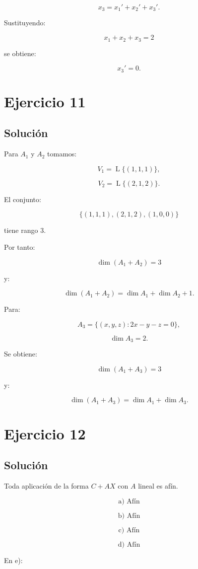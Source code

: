 \documentclass[11pt,a4paper]{article}
\newcommand{\Span}{\operatorname{L}}
\begin{document}
\[
x_3=x_1'+x_2'+x_3'.
\]

Sustituyendo:

\[
x_1+x_2+x_3=2
\]

se obtiene:

\[
\boxed{x_3'=0.}
\]

\section{Ejercicio 11}
\subsection{Solución}

Para $A_1$ y $A_2$ tomamos:

\[
V_1=\Span\{(1,1,1)\},
\]

\[
V_2=\Span\{(2,1,2)\}.
\]

El conjunto:

\[
\{(1,1,1),(2,1,2),(1,0,0)\}
\]

tiene rango $3$.

Por tanto:

\[
\boxed{\dim(A_1+A_2)=3}
\]

y:

\[
\boxed{
\dim(A_1+A_2)=\dim A_1+\dim A_2+1.
}
\]

Para:

\[
A_3=\{(x,y,z):2x-y-z=0\},
\]

\[
\dim A_3=2.
\]

Se obtiene:

\[
\boxed{\dim(A_1+A_3)=3}
\]

y:

\[
\boxed{
\dim(A_1+A_3)=\dim A_1+\dim A_3.
}
\]

\section{Ejercicio 12}
\subsection{Solución}

Toda aplicación de la forma $C+AX$ con $A$ lineal es afín.

\[
\boxed{\text{a) Afín}}
\]

\[
\boxed{\text{b) Afín}}
\]

\[
\boxed{\text{c) Afín}}
\]

\[
\boxed{\text{d) Afín}}
\]

En e):
\end{document}
